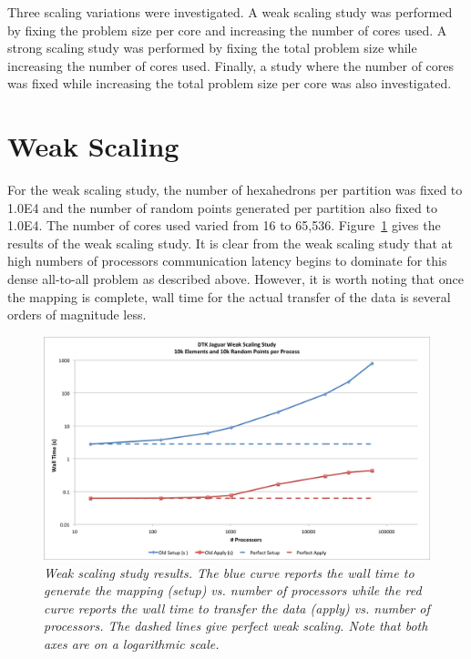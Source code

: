 \documentclass[note]{TechNote}
\begin{document}
Three scaling variations were investigated. A weak scaling study was
performed by fixing the problem size per core and increasing the
number of cores used. A strong scaling study was performed by fixing
the total problem size while increasing the number of cores
used. Finally, a study where the number of cores was fixed while
increasing the total problem size per core was also investigated.

\section{Weak Scaling}
For the weak scaling study, the number of hexahedrons per partition
was fixed to 1.0E4 and the number of random points generated per
partition also fixed to 1.0E4. The number of cores used varied from 16
to 65,536. Figure~\ref{fig:weak_scaling} gives the results of the weak
scaling study. It is clear from the weak scaling study that at high
numbers of processors communication latency begins to dominate for
this dense all-to-all problem as described above. However, it is worth
noting that once the mapping is complete, wall time for the actual
transfer of the data is several orders of magnitude less.

\begin{figure}[htpb!]
  \centering
  \includegraphics[width=5.5in]{WeakScaling.png}
  \caption{\sl Weak scaling study results. The blue curve reports the
    wall time to generate the mapping (setup) vs. number of processors
    while the red curve reports the wall time to transfer the data
    (apply) vs. number of processors. The dashed lines give perfect
    weak scaling. Note that both axes are on a logarithmic scale. }
  \label{fig:weak_scaling}
\end{figure}
\end{document}
